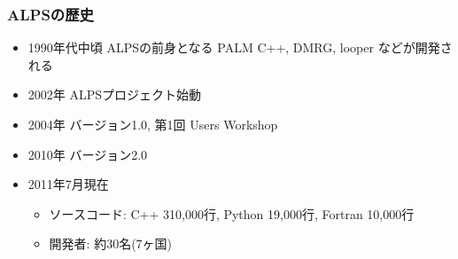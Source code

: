 \begin{frame}
  \frametitle{ALPSの歴史}
  \begin{itemize}
  \item 1990年代中頃 ALPSの前身となる PALM C++, DMRG, looper などが開発される
  \item 2002年 ALPSプロジェクト始動
  \item 2004年 バージョン1.0, 第1回 Users Workshop
  \item 2010年 バージョン2.0
  \item 2011年7月現在
    \begin{itemize}
      \item ソースコード: C++ 310,000行, Python 19,000行, Fortran 10,000行
      \item 開発者: 約30名(7ヶ国)
    \end{itemize}
  \end{itemize}
\end{frame}

